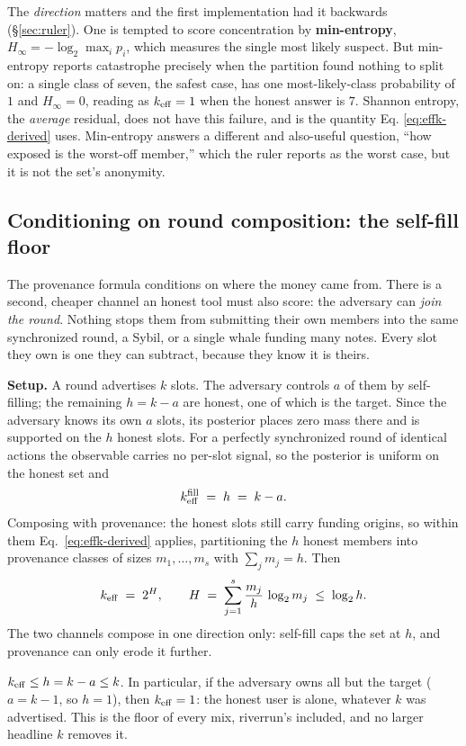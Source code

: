 \documentclass[11pt]{article}
\begin{document}
The \emph{direction} matters and the first implementation had it backwards
(\S\ref{sec:ruler}). One is tempted to score concentration by \textbf{min-entropy},
$H_\infty = -\log_2 \max_i p_i$, which measures the single most likely suspect. But
min-entropy reports catastrophe precisely when the partition found nothing to split on: a
single class of seven, the safest case, has one most-likely-class probability of $1$ and
$H_\infty = 0$, reading as $k_{\mathrm{eff}} = 1$ when the honest answer is $7$. Shannon entropy,
the \emph{average} residual, does not have this failure, and is the quantity Eq.
\ref{eq:effk-derived} uses. Min-entropy answers a different and also-useful question,
``how exposed is the worst-off member,'' which the ruler reports as the worst case, but
it is not the set's anonymity.

\subsection{Conditioning on round composition: the self-fill floor}
\label{sub:selffill}

The provenance formula conditions on where the money came from. There is a second,
cheaper channel an honest tool must also score: the adversary can \emph{join the round}.
Nothing stops them from submitting their own members into the same synchronized round, a
Sybil, or a single whale funding many notes. Every slot they own is one they can subtract,
because they know it is theirs.

\textbf{Setup.} A round advertises $k$ slots. The adversary controls $a$ of them by
self-filling; the remaining $h = k - a$ are honest, one of which is the target. Since the
adversary knows its own $a$ slots, its posterior places zero mass there and is supported
on the $h$ honest slots. For a perfectly synchronized round of identical actions the
observable carries no per-slot signal, so the posterior is uniform on the honest set and
\[ k_{\mathrm{eff}}^{\mathrm{fill}} \;=\; h \;=\; k - a. \]
Composing with provenance: the honest slots still carry funding origins, so within them
Eq.~\ref{eq:effk-derived} applies, partitioning the $h$ honest members into provenance
classes of sizes $m_1, \dots, m_s$ with $\sum_j m_j = h$. Then
\[ k_{\mathrm{eff}} \;=\; 2^{H}, \qquad H \;=\; \sum_{j=1}^{s} \frac{m_j}{h}\,\log_2 m_j
\;\le\; \log_2 h. \]
The two channels compose in one direction only: self-fill caps the set at $h$, and
provenance can only erode it further.

\begin{claimx}
$k_{\mathrm{eff}} \le h = k - a \le k$. In particular, if the adversary owns all but the target
($a = k-1$, so $h = 1$), then $k_{\mathrm{eff}} = 1$: the honest user is alone, whatever $k$ was
advertised. This is the floor of every mix, riverrun's included, and no larger headline
$k$ removes it.
\end{claimx}
\end{document}
